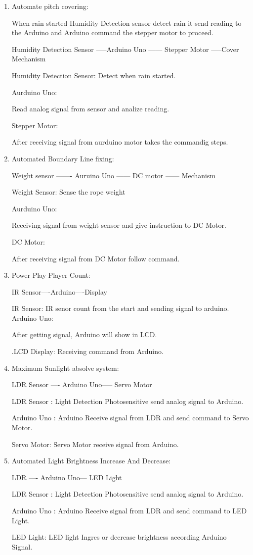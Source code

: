 \documentclass[conference]{IEEEtran}
\begin{document}
\begin{enumerate}
    \item Automate pitch covering: 
    
   When rain started Humidity Detection sensor detect rain it send reading to the Arduino and Arduino command the stepper motor to proceed. 
    
    
    Humidity Detection Sensor  -----Arduino Uno ------ Stepper Motor -----Cover Mechanism
    
    Humidity Detection Sensor: 
Detect when rain started.
    
    Aurduino Uno:
    
   Read analog signal from sensor and analize reading.
    
    Stepper Motor:
    
    After receiving signal from aurduino motor takes the commandig steps.
    
    
    \item Automated Boundary Line fixing: 
    
   Weight sensor ------- Auruino Uno ------ DC motor ------ Mechanism
    
    Weight Sensor: Sense the rope weight 
    
    Aurduino Uno:
    
    Receiving signal from weight sensor and give instruction to DC Motor.
    
    DC Motor:
    
    After receiving signal from  DC Motor follow command. 
    
    \item Power Play Player Count:
    
    IR Sensor----Arduino----Display
    
    IR Sensor:
 IR senor count from the start and sending signal to arduino.
    Arduino Uno:
    
    After getting signal, Arduino will show in LCD.
    
  .LCD Display: Receiving command from Arduino.
    
    \item Maximum Sunlight absolve system:

LDR Sensor ---- Arduino Uno----- Servo Motor

LDR Sensor : Light Detection Photosensitive send analog signal to Arduino.

Arduino Uno : Arduino Receive signal from LDR and send command to Servo Motor.

Servo Motor: Servo Motor receive signal from Arduino.

\item Automated Light Brightness Increase And Decrease:

LDR ---- Arduino Uno--- LED Light

LDR Sensor : Light Detection Photosensitive send analog signal to Arduino.

Arduino Uno : Arduino Receive signal from LDR and send command to LED Light.

LED Light: LED light Ingres or decrease brightness according Arduino Signal.
 
    
\end{enumerate}
\end{document}

